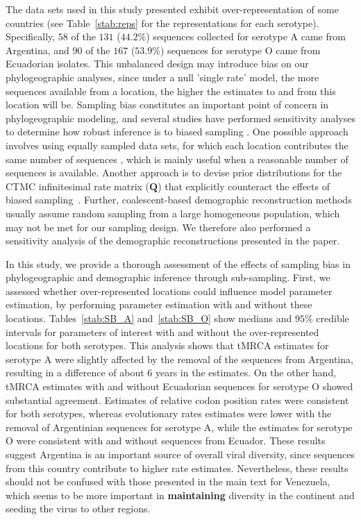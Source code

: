 \documentclass[a4paper,10pt]{article}
\begin{document}
The data sets used in this study presented exhibit over-representation of some countries (see Table~\ref{stab:reps} for the representations for each serotype).
Specifically, $58$ of the $131$ ($44.2\%$) sequences collected for serotype A came from Argentina, and $90$ of the $167$ ($53.9\%$) sequences for serotype O came from Ecuadorian isolates.
This unbalanced design may introduce bias on our phylogeographic analyses, since under a null 'single rate' model, the more sequences available from a location, the higher the estimates to and from this location will be.
Sampling bias constitutes an important point of concern in phylogeographic modeling, and several studies have performed sensitivity analyses to determine how robust inference is to biased sampling \cite{M-Faria2012, M-Lemey2014, M-Bedford2010, M-polar, M-fluPNAS}.
One possible approach involves using equally sampled data sets, for which each location contributes the same number of sequences \cite{M-fluPNAS}, which is mainly useful when a reasonable number of sequences is available.
Another approach is to devise prior distributions for the CTMC infinitesimal rate matrix ($\mathbf{Q}$) that explicitly counteract the effects of biased sampling~\cite{M-Faria2012}.
Further, coalescent-based demographic reconstruction methods usually assume random sampling from a large homogeneous population, which may not be met for our sampling design.
We therefore also performed a sensitivity analysis of the demographic reconstructions presented in the paper.

In this study, we provide a thorough assessment of the effects of sampling bias in phylogeographic and demographic inference through sub-sampling. 
First, we assessed whether over-represented locations could influence model parameter estimation, by performing parameter estimation with and without these locations.
Tables~\ref{stab:SB_A} and~\ref{stab:SB_O} show medians and $95 \%$ credible intervals for parameters of interest with and without the over-represented locations for both serotypes.
This analysis shows that tMRCA estimates for serotype A were slightly affected by the removal of the sequences from Argentina, resulting in a difference of about 6 years in the estimates.
On the other hand, tMRCA estimates with and without Ecuadorian sequences for serotype O showed substantial agreement.
Estimates of relative codon position rates were consistent for both serotypes, whereas evolutionary rates estimates were lower with the removal of Argentinian sequences for serotype A, while the estimates for serotype O were consistent with and without sequences from Ecuador. 
These results suggest Argentina is an important source of overall viral diversity, since sequences from this country contribute to higher rate estimates.
Nevertheless, these results should not be confused with those presented in the main text for Venezuela, which seems to be more important in \textbf{maintaining} diversity in the continent and seeding the virus to other regions.
\end{document}
